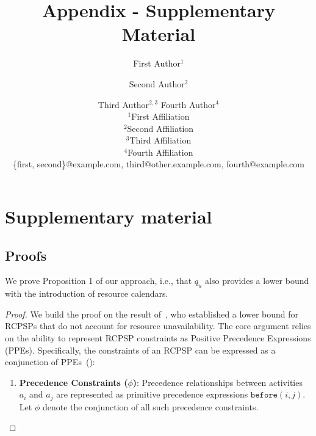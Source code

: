 \documentclass{article}
\title{Appendix - Supplementary Material}
\author{
First Author$^1$
\and
Second Author$^2$\and
Third Author$^{2,3}$\And
Fourth Author$^4$\\
\affiliations
$^1$First Affiliation\\
$^2$Second Affiliation\\
$^3$Third Affiliation\\
$^4$Fourth Affiliation\\
\emails
\{first, second\}@example.com,
third@other.example.com,
fourth@example.com
}
\begin{document}
\maketitle


\section*{Supplementary material}
    \subsection*{Proofs}

We prove Proposition 1 of our approach, i.e., that $q_u$ also provides a lower bound with the introduction of resource calendars.

\begin{proof}
We build the proof on the result of~\cite{beck2007proactive}, who established a lower bound for RCPSPs that do not account for resource unavailability. The core argument relies on the ability to represent RCPSP constraints as Positive Precedence Expressions (PPEs).
Specifically, the constraints of an RCPSP can be expressed as a conjunction of PPEs~(\cite{beck2007proactive}):
\begin{enumerate}
    \item \textbf{Precedence Constraints (\( \phi \))}: Precedence relationships between activities \( a_i \) and \( a_j \) are represented as primitive precedence expressions \( \texttt{before}(i, j) \). Let \( \phi \) denote the conjunction of all such precedence constraints.


\end{enumerate}
\end{proof}
\end{document}
